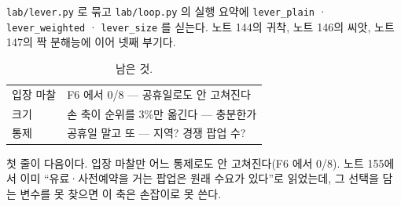 \documentclass[10pt]{article}
\begin{document}
\texttt{lab/lever.py} 로 묶고 \texttt{lab/loop.py} 의 실행 요약에
\texttt{lever\_plain} · \texttt{lever\_weighted} · \texttt{lever\_size} 를
싣는다. 노트 144의 귀착, 노트 146의 씨앗, 노트 147의 짝 분해능에 이어
넷째 부기다.

\begin{table}[t]
\centering\tsize
\caption{남은 것.}
\begin{tabular}{ll}
\toprule
입장 마찰 & F6 에서 0/8 --- 공휴일로도 안 고쳐진다 \\
크기 & 손 축이 순위를 3\%만 옮긴다 --- 충분한가 \\
통제 & 공휴일 말고 또 --- 지역? 경쟁 팝업 수? \\
\bottomrule
\end{tabular}
\end{table}

첫 줄이 다음이다. 입장 마찰만 어느 통제로도 안 고쳐진다(F6 에서 0/8).
노트 155에서 이미 ``유료·사전예약을 거는 팝업은 원래 수요가 있다''로
읽었는데, 그 선택을 담는 변수를 못 찾으면 이 축은 손잡이로 못 쓴다.
\end{document}
